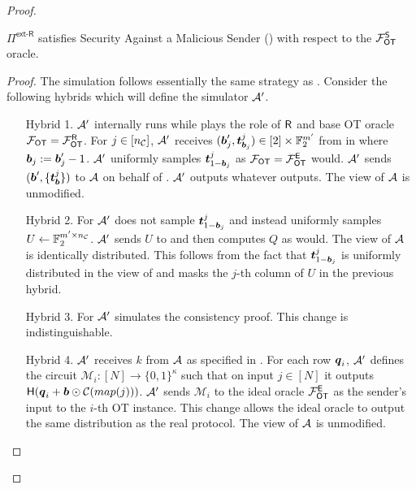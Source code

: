 \begin{proof}
		\begin{claim}\label{claim:ext-R-S-MalSender}
		$\Pi^{\textsf{ext-R}}$ satisfies Security Against a Malicious Sender () with respect to the $\mathcal{F}_{\mathsf{OT}}^\mathsf{S}$ oracle.
	\end{claim}
	\begin{proof}
		
		The simulation follows essentially the same strategy as . Consider the following hybrids which will define the simulator $\mathcal{A}'$. 
		\begin{enumerate}[leftmargin=1.8cm]
			\item[Hybrid 1.] $\mathcal{A}'$ internally runs \Adv while plays the role of $\mathsf{R}$ and base OT oracle $\mathcal{F}_{\mathsf{OT}}=\mathcal{F}_{\mathsf{OT}}^\mathsf{R}$. For $j\in[{n_\mathcal{C}}]$, $\mathcal{A}'$ receives $(\boldsymbol{b}'_j,\boldsymbol{t}^j_{\boldsymbol{b}_j})\in [2]\times \mathbb{F}^{m'}_2$ from \Adv in  where $\boldsymbol{b}_j:=\boldsymbol{b}_j'-1$. $\mathcal{A}'$ uniformly samples $\boldsymbol{t}^j_{1-\boldsymbol{b}_j}$ as $\mathcal{F}_{\mathsf{OT}}=\mathcal{F}_{\mathsf{OT}}^\mathsf{E}$ would. $\mathcal{A}'$ sends $(\boldsymbol{b}', \{\boldsymbol{t}^j_{\boldsymbol{b}}\})$ to $\mathcal{A}$ on behalf of \OOT. $\mathcal{A}'$ outputs whatever \Adv outputs. The view of $\mathcal{A}$ is unmodified.
			
			\item[Hybrid 2.] For  $\mathcal{A}'$ does not sample $\boldsymbol{t}^j_{1-\boldsymbol{b}_j}$ and instead uniformly samples $U\gets\mathbb{F}^{m'\times {n_\mathcal{C}}}_2$. $\mathcal{A}'$ sends $U$ to \Adv and then computes $Q$ as \send would. The view of $\mathcal{A}$ is identically distributed. This follows from the fact that $\boldsymbol{t}^j_{1-\boldsymbol{b}_j}$ is uniformly distributed in the view of \Adv and masks the $j$-th column of $U$ in the previous hybrid. 
			
			\item[Hybrid 3.] For  $\mathcal{A}'$ simulates the consistency proof. This change is indistinguishable. 
			
			\item[Hybrid 4.]\label{hybrid:mmmm} $\mathcal{A}'$ receives $k$ from $\mathcal{A}$ as specified in . For each row $\boldsymbol{q}_i$, $\mathcal{A}'$ defines the circuit $\mathcal{M}_i:[N]\rightarrow\{0,1\}^\kappa$ such that on input $j\in[N]$ it outputs $\mathsf{H}( \boldsymbol{q}_i+\boldsymbol{b}\odot \mathcal{C}(map(j)))$. $\mathcal{A}'$ sends $\mathcal{M}_i$ to the ideal oracle $\mathcal{F}_{\mathsf{OT}}^\mathsf{E}$ as the sender's input to the $i$-th OT instance. This change allows the ideal oracle to output the same distribution as the real protocol. The view of $\mathcal{A}$ is unmodified.
			

\end{enumerate}
\end{proof}
\end{proof}
